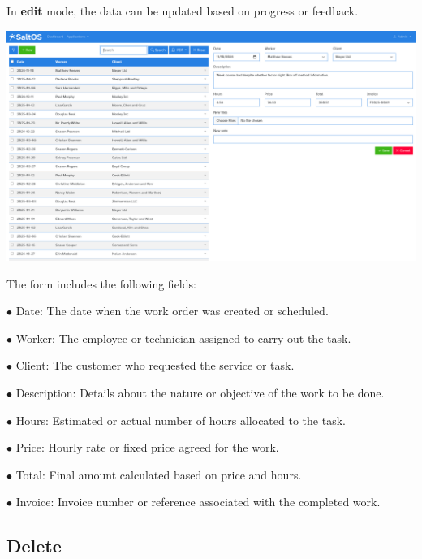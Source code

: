\documentclass[a4paper]{article}
\begin{document}
In \textbf{edit} mode, the data can be updated based on progress or feedback.

\begin{center}\includegraphics[width=1\textwidth]{../ujest/snaps/test-screenshots-js-screenshots-sales-workorders-edit-100-en-us-1-snap.png}\end{center}

The form includes the following fields:

\begin{compactitem}
\item[\color{myblue}$\bullet$] Date: The date when the work order was created or scheduled.
\item[\color{myblue}$\bullet$] Worker: The employee or technician assigned to carry out the task.
\item[\color{myblue}$\bullet$] Client: The customer who requested the service or task.
\item[\color{myblue}$\bullet$] Description: Details about the nature or objective of the work to be done.
\item[\color{myblue}$\bullet$] Hours: Estimated or actual number of hours allocated to the task.
\item[\color{myblue}$\bullet$] Price: Hourly rate or fixed price agreed for the work.
\item[\color{myblue}$\bullet$] Total: Final amount calculated based on price and hours.
\item[\color{myblue}$\bullet$] Invoice: Invoice number or reference associated with the completed work.
\end{compactitem}

\hypertarget{toc175}{}
\subsection{Delete}
\end{document}
